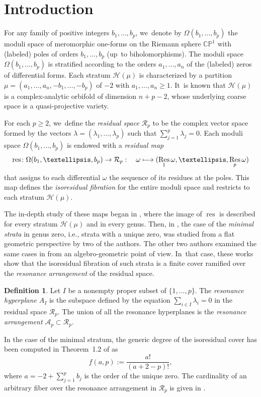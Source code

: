 \documentclass[11pt]{article}
\newcommand{\ie}{i.e.,\xspace}
\newcommand\mto{\mathchoice{\longmapsto}{\mapsto}{\mapsto}{\mapsto}}
\DeclareMathOperator{\res}{res}
\DeclareMathOperator\Res{Res}
\theoremstyle{definition}
\newtheorem{defn}[thm]{Definition}
\begin{document}
\section{Introduction}

For any family of positive integers $b_{1},\dots,b_{p}$, we~denote by $\Omega(b_{1},\dots,b_{p})$ the moduli space of meromorphic one-forms on the Riemann sphere $\mathbb{CP}^{1}$ with (labeled) poles of orders $b_{1},\dots,b_{p}$ (up~to biholomorphisms). The moduli space $\Omega(b_{1},\dots,b_{p})$ is stratified according to the orders $a_{1},\dots,a_{n}$ of the (labeled) zeros of differential forms.
Each stratum $\mathcal{H}(\mu)$ is characterized by a partition $\mu=(a_{1},\dots,a_{n},-b_{1},\dots,-b_{p})$ of $-2$ with $a_{1},\dots,a_{n} \geq 1$. It~is known that $\mathcal{H}(\mu)$ is a complex-analytic orbifold of dimension $n+p-2$, whose underlying coarse space is a quasi-projective variety.

For each $p \geq 2$, we~define the \textit{residual space} $\mathcal{R}_{p}$ to be the complex vector space formed by the vectors $\lambda = (\lambda_{1},\dots,\lambda_{p})$ such that $\sum_{j=1}^{p} \lambda_{j} = 0$. Each moduli space $\Omega(b_{1},\dots,b_{p})$ is endowed with a \textit{residual map}
\[
\res\colon \Omega(b_{1},\dots,b_{p}) \to \mathcal{R}_{p}: \quad\omega \mto (\Res_{1}\omega,\dots,\Res_{p}\omega)
\]
that assigns to each differential $\omega$ the sequence of its residues at the poles. This map defines the \textit{isoresidual fibration} for the entire moduli space and restricts to each stratum $\mathcal{H}(\mu)$.

The in-depth study of these maps began in \cite{getaab}, where the image of $\res$ is described for every stratum $\mathcal{H}(\mu)$ and in every genus. Then, in \cite{GeTaIso}, the case of the {\em minimal strata} in genus zero, \ie strata with a unique zero, was studied from a flat geometric perspective by two of the authors. The other two authors examined the same cases in \cite{ChPrIso} from an algebro-geometric point of view. In~that case, these works show that the isoresidual fibration of such strata is a finite cover ramified over the \textit{resonance arrangement} of the residual space.
\begin{defn}\label{defn:resonanceintro}
Let $I$ be a nonempty proper subset of $\{1,\dots,p\}$. The \textit{resonance hyperplane} $A_{I}$ is the subspace defined by the equation $\sum_{i \in I} \lambda_{i} = 0$ in the residual space $\mathcal{R}_{p}$. The union of all the resonance hyperplanes is the \textit{resonance arrangement} $\mathcal{A}_{p} \subset \mathcal{R}_{p}$.
\end{defn}
In the case of the minimal stratum, the generic degree of the isoresidual cover has been computed in Theorem~1.2 of \cite{GeTaIso} as
\begin{equation}\label{eq:degree}
f(a,p):=\frac{a!}{(a+2-p)!},
\end{equation}
where $a = -2+\sum_{j=1}^{p}b_{j}$ is the order of the unique zero. The cardinality of an arbitrary fiber over the resonance arrangement in $\mathcal{R}_{p}$ is given in \cite[Th.\,1.2]{ChPrIso}.
\end{document}
